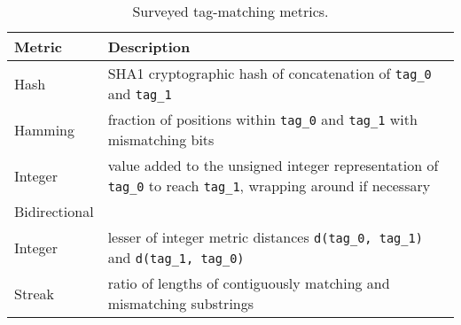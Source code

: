 \begin{table}
\small
\begin{tabularx}{\columnwidth}{l|X}
\textbf{Metric}       & \textbf{Description}                                                                                                                                        \\ \hline
Hash                  & SHA1 cryptographic hash of  concatenation of \texttt{tag\_0} and \texttt{tag\_1} \citep{eastlake2001us}                         \\ \hline
Hamming               & fraction of positions within \texttt{tag\_0} and \texttt{tag\_1} with mismatching bits                                                                         \\ \hline
Integer               & value added to the unsigned integer representation of \texttt{tag\_0} to reach \texttt{tag\_1}, wrapping around if necessary \\ \hline
Bidirectional\\ Integer & \vspace{-4ex}lesser of integer metric distances \texttt{d(tag\_0, tag\_1)} and \texttt{d(tag\_1, tag\_0)}                                                                \\ \hline
Streak                & ratio of lengths of contiguously matching and mismatching substrings \\ \hline
\end{tabularx}


\caption{
Surveyed tag-matching metrics.
}
\label{tab:metrics}
\vspace{-8ex}
\end{table}
